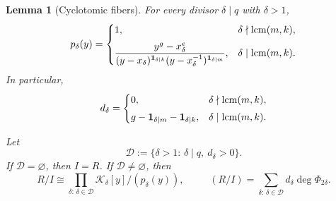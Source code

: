 \documentclass{article}
\theoremstyle{definition}
\theoremstyle{plain}
\newtheorem{lemma}[definition]{Lemma}
\newcommand{\Q}{{\mathbb{Q}}}
\newcommand{\lcm}{{\rm lcm}}
\DeclareMathOperator{\dimQ}{dim_{\Q}}
\begin{document}
\begin{lemma}[Cyclotomic fibers]\label{lem:pretzel-local-uniform}
For every divisor \(\delta\mid q\) with \(\delta>1\),
\begin{equation}\label{eq:pretzel-local-factor}
p_\delta(y)=
\begin{cases}
1,
& \delta\nmid\lcm(m,k),
\\[6pt]
\displaystyle
\frac{y^g-x_\delta^e}
 {(y-x_\delta)^{\mathbf 1_{\delta\mid k}}
  (y-x_\delta^{-1})^{\mathbf 1_{\delta\mid m}}},
& \delta\mid\lcm(m,k).
\end{cases}
\end{equation}
In particular,
\begin{equation}\label{eq:pretzel-local-degree}
d_\delta=
\begin{cases}
0,
& \delta\nmid\lcm(m,k),
\\[3pt]
g-\mathbf 1_{\delta\mid m}-\mathbf 1_{\delta\mid k},
& \delta\mid\lcm(m,k).
\end{cases}
\end{equation}

Let
\[
\mathcal D:=
\{\delta>1:\,\delta\mid q,\ d_\delta>0\}.
\]
If \(\mathcal D=\varnothing\), then \(I=R\).  If
\(\mathcal D\ne\varnothing\), then
\[
R/I\cong
\prod_{\delta:\,\delta\in\mathcal D}
\mathcal K_\delta[y]/(p_\delta(y)),
\qquad
\dimQ(R/I)=
\sum_{\delta:\,\delta\in\mathcal D}d_\delta\deg\Phi_{2\delta}.
\]
\end{lemma}
\end{document}
